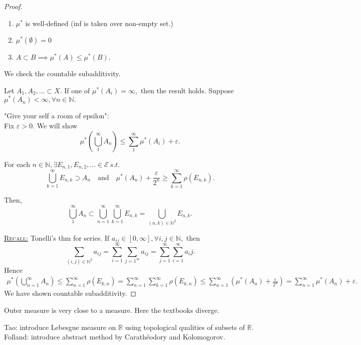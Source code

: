 \documentclass{report}
\newcommand{\R}{\mathbb{R}}
\newcommand{\N}{\mathbb{N}}
\newcommand{\st}{\ s.t.\ }
\newcommand{\fancyem}[1]{\underline{\textsc{#1}}}
\theoremstyle{definition}
\theoremstyle{remark}
\begin{document}
\begin{proof}
\begin{enumerate}
	\item
	$\mu^*$ is well-defined (inf is taken over non-empty set.)
	\item
	$\mu^*(\emptyset) = 0$
	\item
	$A \subset B \implies \mu^*(A) \leq \mu^*(B).$
\end{enumerate}
We check the countable subadditivity.

Let $A_1, A_2, \ldots \subset X.$ If one of $\mu^*(A_i) = \infty,$ then the result holds. Suppose $\mu^*(A_n) < \infty, \forall n \in \N.$

"Give your self a room of epsilon":\\
Fix $\varepsilon > 0.$ We will show \[\mu^*\left(\bigcup_1^\infty A_n\right) \leq \sum_1^\infty \mu^*(A_i) + \varepsilon.\]

For each $n \in \N, \exists E_{n,1}, E_{n,2}, \ldots \in \mathcal{E} \st$ \[\bigcup_{k=1}^\infty E_{n, k} \supset A_n \quad \text{and} \quad \mu^*(A_n) + \frac{\varepsilon}{2^n}\geq \sum_{k=1}^\infty \rho(E_{n, k}).\]

Then, \[
\bigcup_1^\infty A_n \subset \bigcup_{n=1}^\infty \bigcup_{k=1}^\infty E_{n, k} = \bigcup_{(n, k) \in \N^2} E_{n, k}.
\]

\fancyem{Recall:} Tonelli's thm for series.
If $a_{ij} \in [0, \infty], \forall i, j \in \N, $ then
\[
\sum_{(i, j) \in \N^2} a_{ij} = \sum_{i=1}^\infty\sum_{j=1^\infty} a_{ij} = \sum_{j=1}^\infty\sum_{i=1}^\infty a_ij.
\]
Hence 
\begin{align*}
\mu^*\left(\bigcup_{n=1}^\infty A_n\right) \leq \sum_{n=1}^\infty \rho(E_{k, n}) = \sum_{n=1}^\infty \sum_{k=1}^\infty \rho(E_{k, n}) \leq \sum_{n=1}^\infty\left(\mu^*(A_n) + \frac{\varepsilon}{2^n}\right) = \sum_{n=1}^\infty \mu^*(A_n) + \varepsilon.
\end{align*}
We have shown countable subadditivity.
\end{proof}

Outer measure is very close to a measure. Here the textbooks diverge.

Tao: introduce Lebesgue measure on $\R$ using topological qualities of subsets of $\R.$\\
Folland: introduce abstract method by Carathéodory and Kolomogorov.
\end{document}
